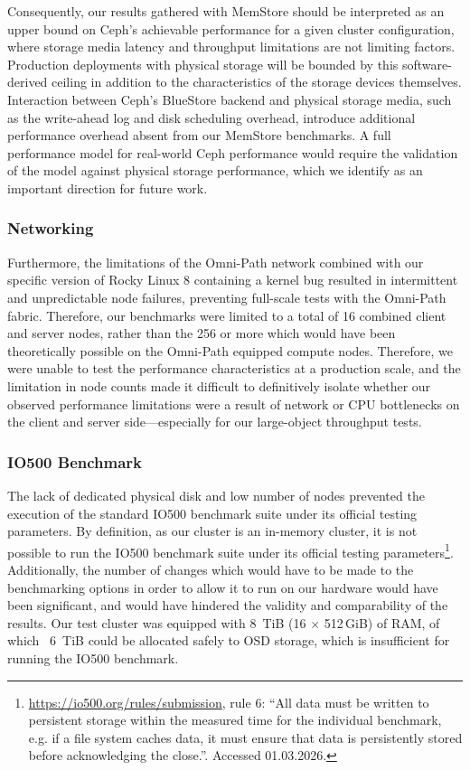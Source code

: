 Consequently, our results gathered with MemStore should be interpreted as an upper bound on Ceph's achievable performance for a given cluster configuration, where storage media latency and throughput limitations are not limiting factors. Production deployments with physical storage will be bounded by this software-derived ceiling in addition to the characteristics of the storage devices themselves. Interaction between Ceph's BlueStore backend and physical storage media, such as the write-ahead log and disk scheduling overhead, introduce additional performance overhead absent from our MemStore benchmarks. A full performance model for real-world Ceph performance would require the validation of the model against physical storage performance,  which we identify as an important direction for future work.

\subsubsection{Networking}

Furthermore, the limitations of the Omni-Path network combined with our specific version of Rocky Linux 8 containing a kernel bug resulted in intermittent and unpredictable node failures, preventing full-scale tests with the Omni-Path fabric. Therefore, our benchmarks were limited to a total of 16 combined client and server nodes, rather than the 256 or more which would have been theoretically possible on the Omni-Path equipped compute nodes. Therefore, we were unable to test the performance characteristics at a production scale, and the limitation in node counts made it difficult to definitively isolate whether our observed performance limitations were a result of network or \ac{CPU} bottlenecks on the client and server side---especially for our large-object throughput tests.

\subsubsection{IO500 Benchmark}

The lack of dedicated physical disk and low number of nodes prevented the execution of the standard IO500 benchmark suite under its official testing parameters. By definition, as our cluster is an in-memory cluster, it is not possible to run the IO500 benchmark suite under its official testing parameters\footnote{\url{https://io500.org/rules/submission}, rule 6: \enquote{All data must be written to persistent storage within the measured time for the individual benchmark, e.g. if a file system caches data, it must ensure that data is persistently stored before acknowledging the close.}. Accessed 01.03.2026.}. Additionally, the number of changes which would have to be made to the benchmarking options in order to allow it to run on our hardware would have been significant, and would have hindered the validity and comparability of the results. Our test cluster was equipped with 8\ TiB (16 $\times$ 512\,GiB) of \ac{RAM}, of which ~6\ TiB could be allocated safely to \ac{OSD} storage, which is insufficient for running the IO500 benchmark.

